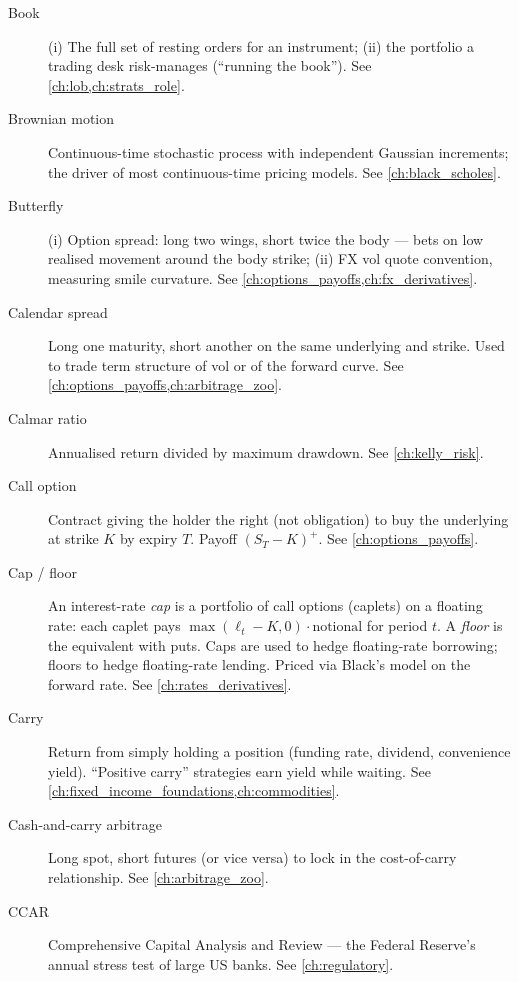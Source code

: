 \begin{description}
\item[Book]
(i) The full set of resting orders for an instrument; (ii) the
portfolio a trading desk risk-manages (``running the book''). See \cref{ch:lob,ch:strats_role}.

\item[Brownian motion]
Continuous-time stochastic process with independent Gaussian
increments; the driver of most continuous-time pricing models. See \cref{ch:black_scholes}.

\item[Butterfly]
(i) Option spread: long two wings, short twice the body --- bets on low
realised movement around the body strike; (ii) FX vol quote convention,
measuring smile curvature. See \cref{ch:options_payoffs,ch:fx_derivatives}.

\item[Calendar spread]
Long one maturity, short another on the same underlying and strike.
Used to trade term structure of vol or of the forward curve. See \cref{ch:options_payoffs,ch:arbitrage_zoo}.

\item[Calmar ratio]
Annualised return divided by maximum drawdown. See \cref{ch:kelly_risk}.

\item[Call option]
Contract giving the holder the right (not obligation) to buy the
underlying at strike $K$ by expiry $T$. Payoff $(S_T - K)^+$. See \cref{ch:options_payoffs}.

\item[Cap / floor]
An interest-rate \emph{cap} is a portfolio of call options (caplets)
on a floating rate: each caplet pays $\max(\ell_t - K, 0)\cdot\text{notional}$
for period $t$. A \emph{floor} is the equivalent with puts. Caps are used
to hedge floating-rate borrowing; floors to hedge floating-rate lending.
Priced via Black's model on the forward rate.
See \cref{ch:rates_derivatives}.

\item[Carry]
Return from simply holding a position (funding rate, dividend,
convenience yield). ``Positive carry'' strategies earn yield while
waiting. See \cref{ch:fixed_income_foundations,ch:commodities}.

\item[Cash-and-carry arbitrage]
Long spot, short futures (or vice versa) to lock in the cost-of-carry
relationship. See \cref{ch:arbitrage_zoo}.

\item[CCAR]
Comprehensive Capital Analysis and Review --- the Federal Reserve's
annual stress test of large US banks. See \cref{ch:regulatory}.


\end{description}
